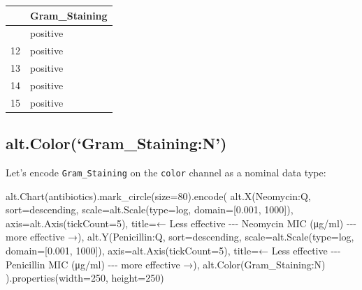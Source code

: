 \documentclass[
  letterpaper,
  DIV=11,
  numbers=noendperiod]{scrartcl}
\newenvironment{Shaded}{\begin{snugshade}}{\end{snugshade}}
\newcommand{\BuiltInTok}[1]{\textcolor[rgb]{0.00,0.23,0.31}{#1}}
\newcommand{\DecValTok}[1]{\textcolor[rgb]{0.68,0.00,0.00}{#1}}
\newcommand{\FloatTok}[1]{\textcolor[rgb]{0.68,0.00,0.00}{#1}}
\newcommand{\NormalTok}[1]{\textcolor[rgb]{0.00,0.23,0.31}{#1}}
\newcommand{\OperatorTok}[1]{\textcolor[rgb]{0.37,0.37,0.37}{#1}}
\newcommand{\StringTok}[1]{\textcolor[rgb]{0.13,0.47,0.30}{#1}}
\begin{document}
\begin{longtable}[]{@{}ll@{}}
\toprule\noalign{}
& Gram\_Staining \\
\midrule\noalign{}
\endhead
\bottomrule\noalign{}
\endlastfoot
11 & positive \\
12 & positive \\
13 & positive \\
14 & positive \\
15 & positive \\
\end{longtable}

\subsection{alt.Color(`Gram\_Staining:N')}\label{alt.colorgram_stainingn}

Let's encode \texttt{Gram\_Staining} on the \texttt{color} channel as a
nominal data type:

\begin{Shaded}
\begin{Highlighting}[]
\NormalTok{alt.Chart(antibiotics).mark\_circle(size}\OperatorTok{=}\DecValTok{80}\NormalTok{).encode(}
\NormalTok{    alt.X(}\StringTok{\textquotesingle{}Neomycin:Q\textquotesingle{}}\NormalTok{,}
\NormalTok{          sort}\OperatorTok{=}\StringTok{\textquotesingle{}descending\textquotesingle{}}\NormalTok{,}
\NormalTok{          scale}\OperatorTok{=}\NormalTok{alt.Scale(}\BuiltInTok{type}\OperatorTok{=}\StringTok{\textquotesingle{}log\textquotesingle{}}\NormalTok{, domain}\OperatorTok{=}\NormalTok{[}\FloatTok{0.001}\NormalTok{, }\DecValTok{1000}\NormalTok{]),}
\NormalTok{          axis}\OperatorTok{=}\NormalTok{alt.Axis(tickCount}\OperatorTok{=}\DecValTok{5}\NormalTok{),}
\NormalTok{          title}\OperatorTok{=}\StringTok{\textquotesingle{}← Less effective {-}{-}{-} Neomycin MIC (μg/ml) {-}{-}{-} more effective →\textquotesingle{}}\NormalTok{),}
\NormalTok{    alt.Y(}\StringTok{\textquotesingle{}Penicillin:Q\textquotesingle{}}\NormalTok{,}
\NormalTok{          sort}\OperatorTok{=}\StringTok{\textquotesingle{}descending\textquotesingle{}}\NormalTok{,}
\NormalTok{          scale}\OperatorTok{=}\NormalTok{alt.Scale(}\BuiltInTok{type}\OperatorTok{=}\StringTok{\textquotesingle{}log\textquotesingle{}}\NormalTok{, domain}\OperatorTok{=}\NormalTok{[}\FloatTok{0.001}\NormalTok{, }\DecValTok{1000}\NormalTok{]),}
\NormalTok{          axis}\OperatorTok{=}\NormalTok{alt.Axis(tickCount}\OperatorTok{=}\DecValTok{5}\NormalTok{),}
\NormalTok{          title}\OperatorTok{=}\StringTok{\textquotesingle{}← Less effective {-}{-}{-} Penicillin MIC (μg/ml) {-}{-}{-} more effective →\textquotesingle{}}\NormalTok{),}
\NormalTok{    alt.Color(}\StringTok{\textquotesingle{}Gram\_Staining:N\textquotesingle{}}\NormalTok{)}
\NormalTok{).properties(width}\OperatorTok{=}\DecValTok{250}\NormalTok{, height}\OperatorTok{=}\DecValTok{250}\NormalTok{)}
\end{Highlighting}
\end{Shaded}
\end{document}
